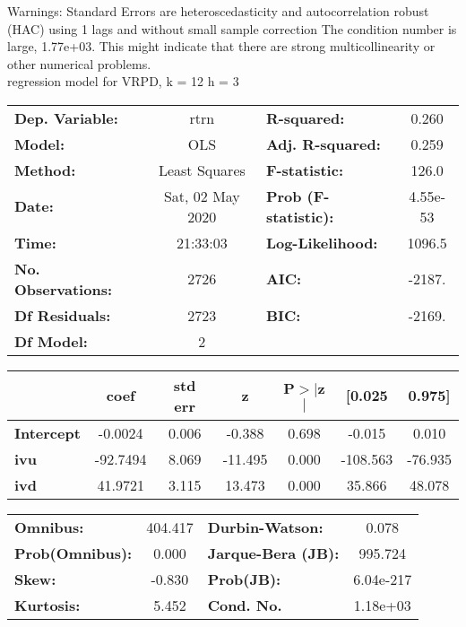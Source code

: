 Warnings: \newline
 [1] Standard Errors are heteroscedasticity and autocorrelation robust (HAC) using 1 lags and without small sample correction \newline
 [2] The condition number is large, 1.77e+03. This might indicate that there are \newline
 strong multicollinearity or other numerical problems.\\ 

regression model for VRPD, k = 12 h = 3\begin{center}
\begin{tabular}{lclc}
\toprule
\textbf{Dep. Variable:}    &       rtrn       & \textbf{  R-squared:         } &     0.260   \\
\textbf{Model:}            &       OLS        & \textbf{  Adj. R-squared:    } &     0.259   \\
\textbf{Method:}           &  Least Squares   & \textbf{  F-statistic:       } &     126.0   \\
\textbf{Date:}             & Sat, 02 May 2020 & \textbf{  Prob (F-statistic):} &  4.55e-53   \\
\textbf{Time:}             &     21:33:03     & \textbf{  Log-Likelihood:    } &    1096.5   \\
\textbf{No. Observations:} &        2726      & \textbf{  AIC:               } &    -2187.   \\
\textbf{Df Residuals:}     &        2723      & \textbf{  BIC:               } &    -2169.   \\
\textbf{Df Model:}         &           2      & \textbf{                     } &             \\
\bottomrule
\end{tabular}
\begin{tabular}{lcccccc}
                   & \textbf{coef} & \textbf{std err} & \textbf{z} & \textbf{P$> |$z$|$} & \textbf{[0.025} & \textbf{0.975]}  \\
\midrule
\textbf{Intercept} &      -0.0024  &        0.006     &    -0.388  &         0.698        &       -0.015    &        0.010     \\
\textbf{ivu}       &     -92.7494  &        8.069     &   -11.495  &         0.000        &     -108.563    &      -76.935     \\
\textbf{ivd}       &      41.9721  &        3.115     &    13.473  &         0.000        &       35.866    &       48.078     \\
\bottomrule
\end{tabular}
\begin{tabular}{lclc}
\textbf{Omnibus:}       & 404.417 & \textbf{  Durbin-Watson:     } &     0.078  \\
\textbf{Prob(Omnibus):} &   0.000 & \textbf{  Jarque-Bera (JB):  } &   995.724  \\
\textbf{Skew:}          &  -0.830 & \textbf{  Prob(JB):          } & 6.04e-217  \\
\textbf{Kurtosis:}      &   5.452 & \textbf{  Cond. No.          } &  1.18e+03  \\
\bottomrule
\end{tabular}
\end{center}

